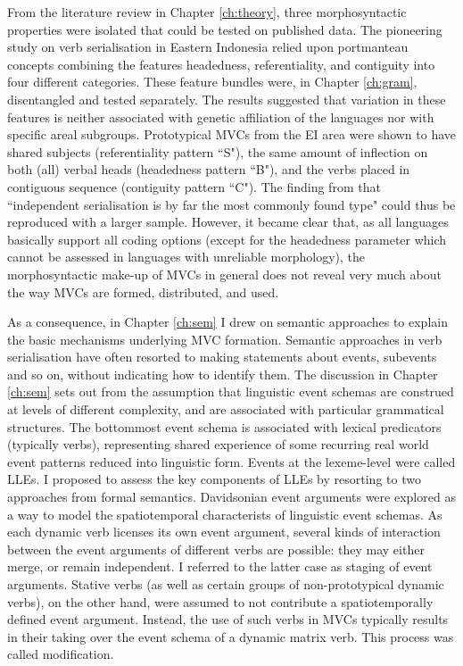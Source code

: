 From the literature review in Chapter \ref{ch:theory}, three morphosyntactic properties were isolated that could be tested on published data. The pioneering study on verb serialisation in Eastern Indonesia \citep{vanstaden2008serial} relied upon portmanteau concepts combining the features headedness, referentiality, and contiguity into four different categories. These feature bundles were, in Chapter \ref{ch:gram}, disentangled and tested separately. The results suggested that variation in these features is neither associated with genetic affiliation of the languages nor with specific areal subgroups. Prototypical MVCs from the EI area were shown to have shared subjects (referentiality pattern ``S"), the same amount of inflection on both (all) verbal heads (headedness pattern ``B"), and the verbs placed in contiguous sequence (contiguity pattern ``C"). The finding from \citet[48]{vanstaden2008serial} that ``independent serialisation is by far the most commonly found type" could thus be reproduced with a larger sample. However, it became clear that, as all languages basically support all coding options (except for the headedness parameter which cannot be assessed in languages with unreliable morphology), the morphosyntactic make-up of MVCs in general does not reveal very much about the way MVCs are formed, distributed, and used.

As a consequence, in Chapter \ref{ch:sem} I drew on semantic approaches to explain the basic mechanisms underlying MVC formation. Semantic approaches in verb serialisation have often resorted to making statements about events, subevents and so on, without indicating how to identify them. The discussion in Chapter \ref{ch:sem} sets out from the assumption that linguistic event schemas are construed at levels of different complexity, and are associated with particular grammatical structures. The bottommost event schema is associated with lexical predicators (typically verbs), representing shared experience of some recurring real world event patterns reduced into linguistic form. Events at the lexeme-level were called LLEs. I proposed to assess the key components of LLEs by resorting to two approaches from formal semantics. Davidsonian event arguments were explored as a way to model the spatiotemporal characterists of linguistic event schemas. As each dynamic verb licenses its own event argument, several kinds of interaction between the event arguments of different verbs are possible: they may either merge, or remain independent. I referred to the latter case as staging of event arguments. Stative verbs (as well as certain groups of non-prototypical dynamic verbs), on the other hand, were assumed to not contribute a spatiotemporally defined event argument. Instead, the use of such verbs in MVCs typically results in their taking over the event schema of a dynamic matrix verb. This process was called modification. 

